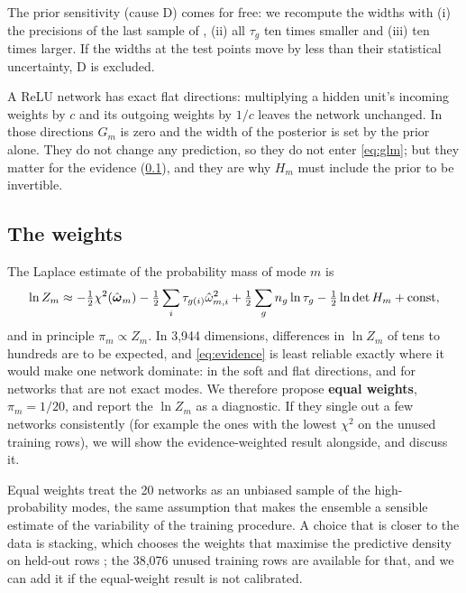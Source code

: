 The prior sensitivity (cause D) comes for free: we recompute the widths with (i) the
precisions of the last sample of , (ii) all $\tau_g$ ten times
smaller and (iii) ten times larger. If the widths at the test points move by less than
their statistical uncertainty, D is excluded.

\begin{watch}[Symmetries]
A ReLU network has exact flat directions: multiplying a hidden unit's incoming weights by
$c$ and its outgoing weights by $1/c$ leaves the network unchanged. In those directions
$G_m$ is zero and the width of the posterior is set by the prior alone. They do not change
any prediction, so they do not enter \cref{eq:glm}; but they matter for the evidence
(\cref{sec:weights}), and they are why $H_m$ must include the prior to be invertible.
\end{watch}

\subsection{The weights}
\label{sec:weights}

The Laplace estimate of the probability mass of mode $m$ is
\begin{equation}
  \ln Z_m \approx -\tfrac12\chi^2(\hat{\boldsymbol{\omega}}_m) - \tfrac12 \sum_i \tau_{g(i)}\hat\omega_{m,i}^2
  + \tfrac12 \sum_g n_g \ln\tau_g - \tfrac12 \ln\det H_m + \text{const},
  \label{eq:evidence}
\end{equation}
and in principle $\pi_m \propto Z_m$. In 3,944 dimensions, differences in $\ln Z_m$ of tens
to hundreds are to be expected, and \cref{eq:evidence} is least reliable exactly where it
would make one network dominate: in the soft and flat directions, and for networks that are
not exact modes. We therefore propose \textbf{equal weights}, $\pi_m = 1/20$, and report the
$\ln Z_m$ as a diagnostic. If they single out a few networks consistently (for example the
ones with the lowest $\chi^2$ on the unused training rows), we will show the evidence-weighted
result alongside, and discuss it.

\begin{aside}
Equal weights treat the 20 networks as an unbiased sample of the high-probability modes, the
same assumption that makes the ensemble a sensible estimate of the variability of the
training procedure. A choice that is closer to the data is stacking, which chooses the
weights that maximise the predictive density on held-out rows \cite{Yao:2022}; the 38,076
unused training rows are available for that, and we can add it if the equal-weight result
is not calibrated.
\end{aside}

